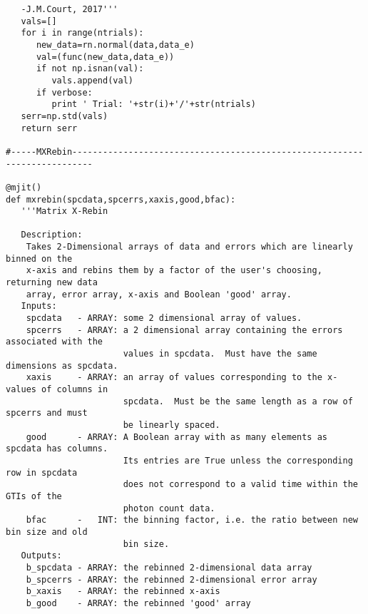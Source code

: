 \begin{verbatim}
   -J.M.Court, 2017'''
   vals=[]
   for i in range(ntrials):
      new_data=rn.normal(data,data_e)
      val=(func(new_data,data_e))
      if not np.isnan(val):
         vals.append(val)
      if verbose:
         print ' Trial: '+str(i)+'/'+str(ntrials)
   serr=np.std(vals)
   return serr

#-----MXRebin--------------------------------------------------------------------------

@mjit()
def mxrebin(spcdata,spcerrs,xaxis,good,bfac):
   '''Matrix X-Rebin

   Description:
    Takes 2-Dimensional arrays of data and errors which are linearly binned on the
    x-axis and rebins them by a factor of the user's choosing, returning new data
    array, error array, x-axis and Boolean 'good' array.
   Inputs:
    spcdata   - ARRAY: some 2 dimensional array of values.
    spcerrs   - ARRAY: a 2 dimensional array containing the errors associated with the
                       values in spcdata.  Must have the same dimensions as spcdata.
    xaxis     - ARRAY: an array of values corresponding to the x-values of columns in
                       spcdata.  Must be the same length as a row of spcerrs and must
                       be linearly spaced.
    good      - ARRAY: A Boolean array with as many elements as spcdata has columns.
                       Its entries are True unless the corresponding row in spcdata
                       does not correspond to a valid time within the GTIs of the
                       photon count data.
    bfac      -   INT: the binning factor, i.e. the ratio between new bin size and old
                       bin size.
   Outputs:
    b_spcdata - ARRAY: the rebinned 2-dimensional data array
    b_spcerrs - ARRAY: the rebinned 2-dimensional error array
    b_xaxis   - ARRAY: the rebinned x-axis
    b_good    - ARRAY: the rebinned 'good' array


\end{verbatim}
